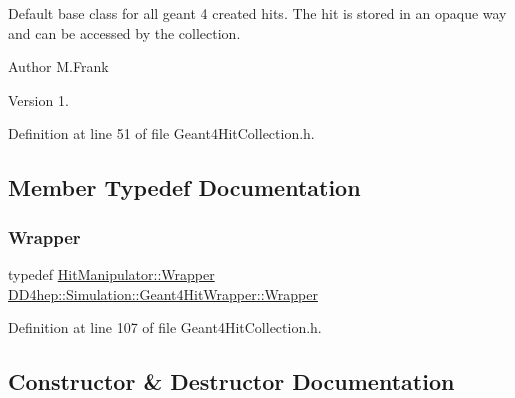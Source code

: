 Default base class for all geant 4 created hits. The hit is stored in an opaque way and can be accessed by the collection.

\begin{DoxyAuthor}{Author}
M.\+Frank 
\end{DoxyAuthor}
\begin{DoxyVersion}{Version}
1. 
\end{DoxyVersion}


Definition at line 51 of file Geant4\+Hit\+Collection.\+h.



\subsection{Member Typedef Documentation}
\hypertarget{class_d_d4hep_1_1_simulation_1_1_geant4_hit_wrapper_a4779e35eba7d553e0f2d497c49a42ec6}{}\label{class_d_d4hep_1_1_simulation_1_1_geant4_hit_wrapper_a4779e35eba7d553e0f2d497c49a42ec6} 
\subsubsection{\texorpdfstring{Wrapper}{Wrapper}}
{\footnotesize\ttfamily typedef \hyperlink{class_d_d4hep_1_1_simulation_1_1_geant4_hit_wrapper_1_1_hit_manipulator_a4bb62cc7e4979a8d0aea281477a4e38e}{Hit\+Manipulator\+::\+Wrapper} \hyperlink{class_d_d4hep_1_1_simulation_1_1_geant4_hit_wrapper_a4779e35eba7d553e0f2d497c49a42ec6}{D\+D4hep\+::\+Simulation\+::\+Geant4\+Hit\+Wrapper\+::\+Wrapper}}



Definition at line 107 of file Geant4\+Hit\+Collection.\+h.



\subsection{Constructor \& Destructor Documentation}
\hypertarget{class_d_d4hep_1_1_simulation_1_1_geant4_hit_wrapper_a57ccfb5f6f606751279a9c3222532250}{}\label{class_d_d4hep_1_1_simulation_1_1_geant4_hit_wrapper_a57ccfb5f6f606751279a9c3222532250} 
